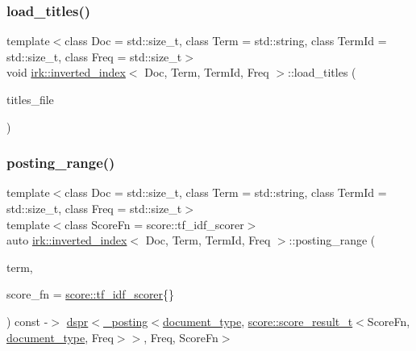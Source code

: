 \subsubsection{\texorpdfstring{load\+\_\+titles()}{load\_titles()}}
{\footnotesize\ttfamily template$<$class Doc  = std\+::size\+\_\+t, class Term  = std\+::string, class Term\+Id  = std\+::size\+\_\+t, class Freq  = std\+::size\+\_\+t$>$ \\
void \mbox{\hyperlink{classirk_1_1inverted__index}{irk\+::inverted\+\_\+index}}$<$ Doc, Term, Term\+Id, Freq $>$\+::load\+\_\+titles (\begin{DoxyParamCaption}\item[{fs\+::path}]{titles\+\_\+file }\end{DoxyParamCaption})\hspace{0.3cm}{\ttfamily [inline]}}

\mbox{\label{classirk_1_1inverted__index_a95a85fe09dae6dfb47cd7bdfa8ce2a4d}} 
\subsubsection{\texorpdfstring{posting\+\_\+range()}{posting\_range()}\hspace{0.1cm}{\footnotesize\ttfamily [1/2]}}
{\footnotesize\ttfamily template$<$class Doc  = std\+::size\+\_\+t, class Term  = std\+::string, class Term\+Id  = std\+::size\+\_\+t, class Freq  = std\+::size\+\_\+t$>$ \\
template$<$class Score\+Fn  = score\+::tf\+\_\+idf\+\_\+scorer$>$ \\
auto \mbox{\hyperlink{classirk_1_1inverted__index}{irk\+::inverted\+\_\+index}}$<$ Doc, Term, Term\+Id, Freq $>$\+::posting\+\_\+range (\begin{DoxyParamCaption}\item[{const std\+::string \&}]{term,  }\item[{Score\+Fn}]{score\+\_\+fn = {\ttfamily \mbox{\hyperlink{structirk_1_1score_1_1tf__idf__scorer}{score\+::tf\+\_\+idf\+\_\+scorer}}\{\}} }\end{DoxyParamCaption}) const -\/$>$ \mbox{\hyperlink{namespaceirk_af92c7aae439f59ccae252f027f851c24}{dspr}}$<$\mbox{\hyperlink{structirk_1_1__posting}{\+\_\+posting}}$<$\mbox{\hyperlink{classirk_1_1inverted__index_ab708a9d1605de705341f3ed81bd7d5e7}{document\+\_\+type}}, \mbox{\hyperlink{namespaceirk_1_1score_af4a2c84b3548a4ac12aac3862bc94875}{score\+::score\+\_\+result\+\_\+t}}$<$Score\+Fn, \mbox{\hyperlink{classirk_1_1inverted__index_ab708a9d1605de705341f3ed81bd7d5e7}{document\+\_\+type}}, Freq$>$$>$,
            Freq,
            Score\+Fn$>$
    \hspace{0.3cm}{\ttfamily [inline]}}

